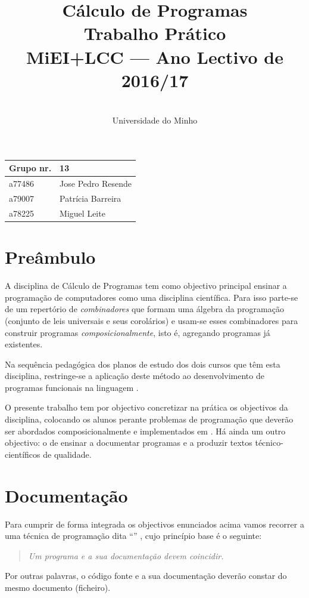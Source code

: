 \documentclass[a4paper]{article}
\title{
       	    Cálculo de Programas
\\
       	Trabalho Prático
\\
       	MiEI+LCC --- Ano Lectivo de 2016/17
}
\author{
       	\dium
\\
       	Universidade do Minho
}
\date\mydate
\begin{document}
\maketitle

\begin{center}\large
\begin{tabular}{ll}
\textbf{Grupo} nr. & 13
\\\hline
a77486 & Jose Pedro Resende
\\
a79007 & Patrícia Barreira	
\\
a78225 & Miguel Leite
\end{tabular}
\end{center}

\tableofcontents

\newpage

\section{Preâmbulo}

A disciplina de Cálculo de Programas tem como objectivo principal ensinar
a progra\-mação de computadores como uma disciplina científica. Para isso
parte-se de um repertório de \emph{combinadores} que formam uma álgebra da
programação (conjunto de leis universais e seus corolários) e usam-se esses
combinadores para construir programas \emph{composicionalmente}, isto é,
agregando programas já existentes.
  
Na sequência pedagógica dos planos de estudo dos dois cursos que têm esta
disciplina, restringe-se a aplicação deste método ao desenvolvimento de programas
funcionais na linguagem \Haskell.

O presente trabalho tem por objectivo concretizar na prática os objectivos
da disciplina, colocando os alunos perante problemas de programação que
deverão ser abordados composicionalmente e implementados em \Haskell.
Há ainda um outro objectivo: o de ensinar a documentar programas e
a produzir textos técnico-científicos de qualidade.

\section{Documentação}
Para cumprir de forma integrada os objectivos enunciados acima vamos recorrer
a uma técnica de programa\-ção dita ``'' \cite{Kn92}, cujo
princípio base é o seguinte:
\begin{quote}\em
Um programa e a sua documentação devem coincidir.
\end{quote}
Por outras palavras, o código fonte e a sua documentação deverão constar
do mesmo documento (ficheiro).
\end{document}
